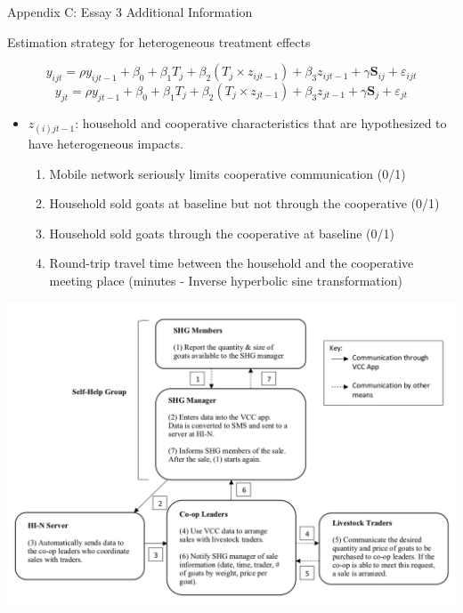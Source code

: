 \documentclass[aspectratio=169]{beamer}
\newenvironment{wideitemize}{\itemize\addtolength{\itemsep}{10pt}}{\enditemize}
\begin{document}
\begin{frame}{Appendix C: Essay 3 Additional Information}

\begin{wideitemize}
    \item Estimation strategy for heterogeneous treatment effects

\begin{equation} \label{eq:HTE1}
y_{ijt} = \rho y_{ijt-1} + \beta_{0} + \beta_{1} T_{j} + \beta_{2} (T_{j} \times z_{ijt-1}) + \beta_3 z_{ijt-1} + \gamma \textbf{S}_{ij} + \varepsilon_{ijt}
\end{equation}
\begin{equation} \label{eq:HTE2}
y_{jt} = \rho y_{jt-1} + \beta_{0} + \beta_{1} T_{j} + \beta_{2} (T_{j} \times z_{jt-1}) + \beta_3 z_{jt-1} + \gamma \textbf{S}_{j} + \varepsilon_{jt}
\end{equation}

    \vspace{.25cm}
    \begin{itemize}
        \item $z_{(i)jt-1}$: household and cooperative characteristics that are hypothesized to have heterogeneous impacts. \vspace{.25cm}
            \begin{enumerate}
                \item Mobile network seriously limits cooperative communication (0/1)
                \item Household sold goats at baseline but not through the cooperative (0/1)
                \item Household sold goats through the cooperative at baseline (0/1)
                \item Round-trip travel time between the household and the cooperative meeting place (minutes - Inverse hyperbolic sine transformation)
            \end{enumerate}
    \end{itemize}
\end{wideitemize}

\end{frame}

\begin{frame}
    \begin{center}
        \includegraphics[width=.85\textwidth,trim=4 4 4 4,clip]{VCCdiagram.png}
    \end{center}
\end{frame}
\end{document}
